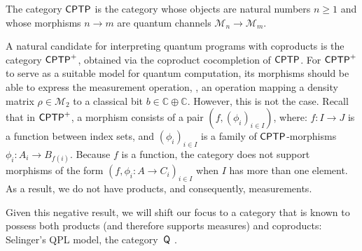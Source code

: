 
\begin{definition} \label{ex:cat_cptp}
The category $\mathsf{CPTP}$ is the category whose objects are natural numbers $n \geq 1$ and whose morphisms $n \rightarrow m$ are quantum channels $\mathcal{M}_n \rightarrow \mathcal{M}_m$.
\end{definition}


A natural candidate for interpreting quantum programs with coproducts is the category $\mathsf{CPTP}^+$, obtained via the coproduct cocompletion of $\mathsf{CPTP}$. For $\mathsf{CPTP}^+$ to serve as a suitable model for quantum computation, its morphisms should be able to express the measurement operation, \ie, an operation mapping a density matrix $\rho \in \mathcal{M}_2$ to a classical bit $b \in \mathbb{C} \oplus \mathbb{C}$. However, this is not the case.
Recall that in $\mathsf{CPTP}^+$, a morphism consists of a pair $(f, (\phi_i)_{i \in I})$, where: $f \colon I \to J$ is a function between index sets, and
 $(\phi_i)_{i \in I}$ is a family of $\mathsf{CPTP}$-morphisms $\phi_i \colon A_i \to B_{f(i)}$. Because $f$ is a function, the category does not support morphisms of the form $(f,\phi_i \colon A \to C_i)_{i \in I}$ when $I$ has more than one element. As a result, we do not have products, and consequently, measurements.


Given this negative result, we will shift our focus to a category that is known to possess both products (and therefore supports measures) and coproducts: Selinger’s QPL model, the category~$\mathsf{Q}$ \cite{selinger2004towards}.

